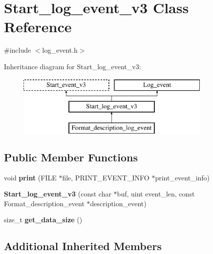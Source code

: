 \hypertarget{classStart__log__event__v3}{}\section{Start\+\_\+log\+\_\+event\+\_\+v3 Class Reference}
\label{classStart__log__event__v3}


{\ttfamily \#include $<$log\+\_\+event.\+h$>$}

Inheritance diagram for Start\+\_\+log\+\_\+event\+\_\+v3\+:\begin{figure}[H]
\begin{center}
\leavevmode
\includegraphics[height=3.000000cm]{classStart__log__event__v3}
\end{center}
\end{figure}
\subsection*{Public Member Functions}
\begin{DoxyCompactItemize}
\item 
\mbox{\label{classStart__log__event__v3_addab6c656f528d0b7de78fd50aaf1b13}} 
void {\bfseries print} (F\+I\+LE $\ast$file, P\+R\+I\+N\+T\+\_\+\+E\+V\+E\+N\+T\+\_\+\+I\+N\+FO $\ast$print\+\_\+event\+\_\+info)
\item 
\mbox{\label{classStart__log__event__v3_a56b3faeeef258d80141a46c45e27504b}} 
{\bfseries Start\+\_\+log\+\_\+event\+\_\+v3} (const char $\ast$buf, uint event\+\_\+len, const Format\+\_\+description\+\_\+event $\ast$description\+\_\+event)
\item 
\mbox{\label{classStart__log__event__v3_ac0ff87f351e4e66500569fa40ef2e2f9}} 
size\+\_\+t {\bfseries get\+\_\+data\+\_\+size} ()
\end{DoxyCompactItemize}
\subsection*{Additional Inherited Members}


